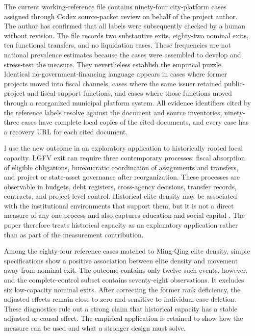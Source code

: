 The current working-reference file contains ninety-four city-platform cases
assigned through Codex source-packet review on behalf of the project author.
The author has confirmed that all labels were subsequently checked by a human
without revision. The file records two substantive
exits, eighty-two nominal exits, ten
functional transfers, and no liquidation cases. These frequencies are not
national prevalence estimates because the cases were assembled to develop and
stress-test the measure. They nevertheless establish the empirical puzzle.
Identical no-government-financing language appears in cases where former
projects moved into fiscal channels, cases where the same issuer retained
public-project and fiscal-support functions, and cases where those functions
moved through a reorganized municipal platform system. All evidence identifiers
cited by the reference labels resolve against the document and source
inventories; ninety-three cases have complete local copies of the cited
documents, and every case has a recovery URL for each cited document.

I use the new outcome in an exploratory application to historically rooted
local capacity. LGFV exit can require three contemporary processes: fiscal
absorption of eligible obligations, bureaucratic coordination of assignments
and transfers, and project or state-asset governance after reorganization.
These processes are observable in budgets, debt registers, cross-agency
decisions, transfer records, contracts, and project-level control. Historical
elite density may be associated with the institutional environments that
support them, but it is not a direct measure of any one process and also
captures education and social capital \citep{chen_kung_ma_2020_keju}. The paper
therefore treats historical capacity as an explanatory application rather than
as part of the measurement contribution.

Among the eighty-four reference cases matched to Ming-Qing elite density,
simple specifications show a positive association between elite density and
movement away from nominal exit. The outcome contains only twelve such events,
however, and the complete-control subset contains seventy-eight observations.
It excludes six low-capacity nominal exits. After correcting the former rank
deficiency, the adjusted effects remain close to zero and sensitive to
individual case deletion. These diagnostics rule out a strong claim that
historical capacity has a stable adjusted or causal effect. The empirical
application is retained to show how the measure can be used and what a stronger
design must solve.


